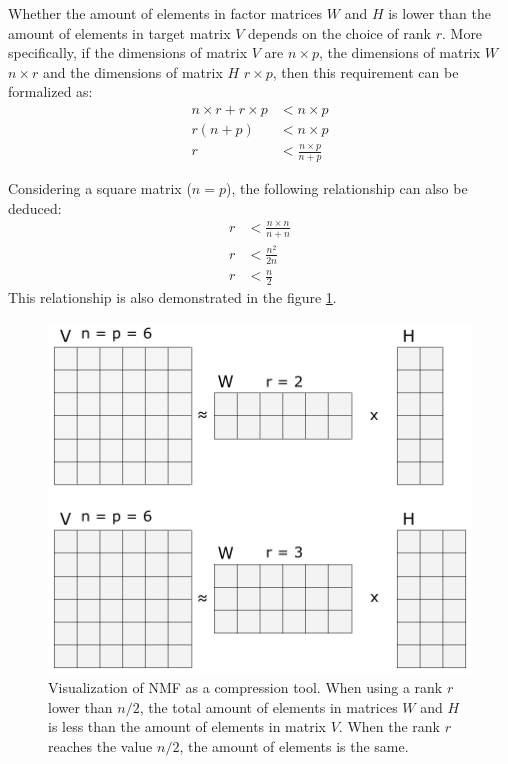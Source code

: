 \documentclass[thesis=M,english]{FITthesis}[2012/10/20]
\begin{document}
Whether the amount of elements in factor matrices $W$ and $H$ is lower than
the amount of elements in target matrix $V$ depends on the choice of rank $r$.
More specifically, if the dimensions of matrix $V$ are $n \times p$, the
dimensions of matrix $W$ $n \times r$ and the dimensions of matrix $H$
$r \times p$, then this requirement can be formalized as:
\begin{align*}
  n \times r + r \times p &< n \times p\\
  r (n + p) &< n \times p\\
  r &< \frac{n \times p}{n + p}
\end{align*}

Considering a square matrix ($n = p$), the following relationship can also
be deduced:
\begin{align*}
  r &< \frac{n \times n}{n + n}\\
  r &< \frac{n^{2}}{2n}\\
  r &< \frac{n}{2}
\end{align*}
This relationship is also demonstrated in the figure \ref{fig:maxrank}.

\begin{figure}[h]
  \centering
  \caption{Visualization of NMF as a compression tool. When using a rank $r$ lower than $n/2$, the
           total amount of elements in matrices $W$ and $H$ is less than the amount of elements in
           matrix $V$. When the rank $r$ reaches the value $n/2$, the amount of elements is the same.}
  \label{fig:maxrank}
  \includegraphics[scale=0.7]{maxrank}
\end{figure}
\end{document}

